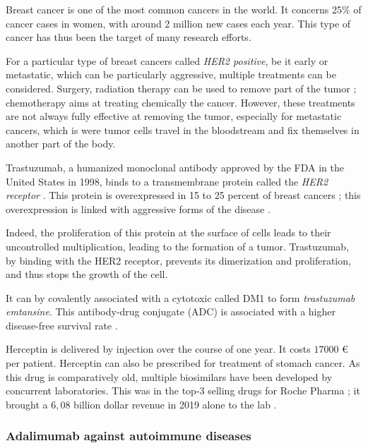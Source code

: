 Breast cancer is one of the most common cancers in the world.
It concerns 25\% of cancer cases in women, with around 2 million new cases
each year. This type of cancer has thus been the target of many research efforts.

For a particular type of breast cancers called \emph{HER2 positive}, be it early 
or metastatic, which can be particularly aggressive, multiple treatments can
be considered. Surgery, radiation therapy can be used to remove part of the tumor ;
chemotherapy aims at treating chemically the cancer. However, these treatments are
not always fully effective at removing the tumor, especially for metastatic cancers,
which is were tumor cells travel in the bloodstream and fix themselves in another
part of the body.

Trastuzumab, a humanized monoclonal antibody approved by the FDA in the 
United States in 1998, binds to a transmembrane protein called 
the \emph{HER2 receptor} \cite{zhao_trastuzumab_2021}. This protein is
overexpressed in 15 to 25 percent of breast cancers ; this overexpression
is linked with aggressive forms of the disease \cite{piccart-gebhart_trastuzumab_2005}.

Indeed, the proliferation of this protein at the surface of cells leads to their
uncontrolled multiplication, leading to the formation of a tumor.
Trastuzumab, by binding with the HER2 receptor, prevents its dimerization and
proliferation, and thus stops the growth of the cell.

It can by covalently associated with a cytotoxic called DM1 to form
\emph{trastuzumab emtansine}. This antibody-drug conjugate (ADC) 
is associated with a higher disease-free survival rate
\cite{lambert_ado-trastuzumab_2014}.

Herceptin is delivered by injection over the course of one year.
It costs $17000$ € per patient. Herceptin can also be prescribed for treatment of stomach cancer. 
As this drug is comparatively old, multiple
biosimilars have been developed by concurrent laboratories. This was in the
top-3 selling drugs for Roche Pharma ; it brought a $6,08$ billion dollar
revenue in 2019 alone to the lab \cite{fierce_pharma_herceptin_2020}.


\subsubsection{Adalimumab against autoimmune diseases}

